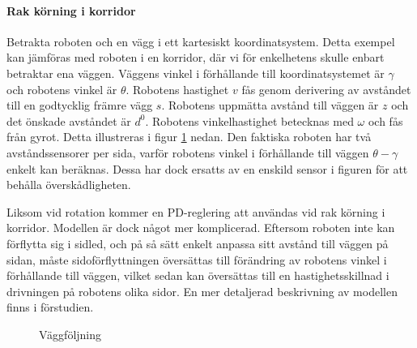 \documentclass[11pt]{article}
\begin{document}
\begin{flushleft}
\paragraph{Rak körning i korridor} Betrakta roboten och en vägg i ett kartesiskt koordinatsystem. Detta exempel kan jämföras med roboten i en korridor, där vi för enkelhetens skulle enbart betraktar ena väggen. Väggens vinkel i förhållande till koordinatsystemet är $\gamma$ och robotens vinkel är $\theta$. Robotens hastighet $v$ fås genom derivering av avståndet till en godtycklig främre vägg $s$. Robotens uppmätta avstånd till väggen är $z$ och det önskade avståndet är $d^0$. Robotens vinkelhastighet betecknas med $\omega$ och fås från gyrot. Detta illustreras i figur \ref{robotwall} nedan. Den faktiska roboten har två avståndssensorer per sida, varför robotens vinkel i förhållande till väggen $\theta - \gamma$ enkelt kan beräknas. Dessa har dock ersatts av en enskild sensor i figuren för att behålla överskådligheten.

Liksom vid rotation kommer en PD-reglering att användas vid rak körning i korridor. Modellen är dock något mer komplicerad. Eftersom roboten inte kan förflytta sig i sidled, och på så sätt enkelt anpassa sitt avstånd till väggen på sidan, måste sidoförflyttningen översättas till förändring av robotens vinkel i förhållande till väggen, vilket sedan kan översättas till en hastighetsskillnad i drivningen på robotens olika sidor. En mer detaljerad beskrivning av modellen finns i förstudien.
\begin{figure}[H] 
\centering
\noindent{}
	\caption{Väggföljning\label{robotwall}}	
\end{figure}





\end{flushleft}
\end{document}
